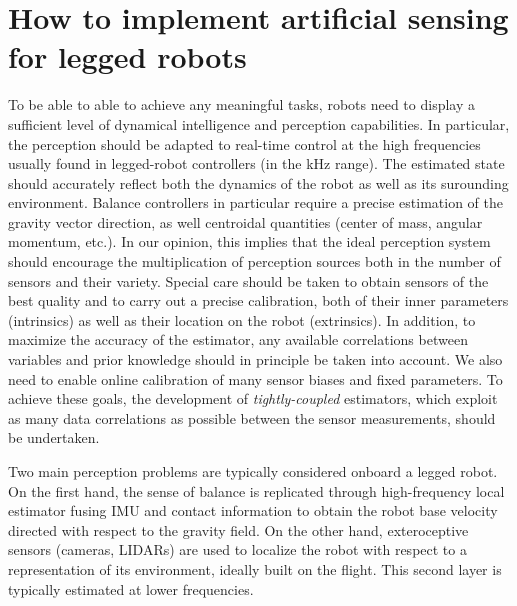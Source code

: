 \section{How to implement artificial sensing for legged robots}
To be able to able to achieve any meaningful tasks, robots need to display a sufficient level of dynamical intelligence and perception capabilities. 
In particular, the perception should be adapted to real-time control at the high frequencies usually found in legged-robot controllers (in the kHz range).
The estimated state should accurately reflect both the dynamics of the robot as well as its surounding environment. Balance controllers in particular require a precise 
estimation of the gravity vector direction, as well centroidal quantities (center of mass, angular momentum, etc.).
In our opinion, this implies that the ideal perception system should encourage the multiplication of perception sources both in the number of sensors and their variety.
Special care should be taken to obtain sensors of the best quality and to carry out a precise calibration, both of their inner parameters (intrinsics) as well as their
location on the robot (extrinsics). 
In addition, to maximize the accuracy of the estimator, any available correlations between variables and prior knowledge should in principle be taken into account. 
We also need to enable online calibration of many sensor biases and fixed parameters. To achieve these goals, the development of \textit{tightly-coupled} estimators, 
which exploit as many data correlations as possible between the sensor measurements, should be undertaken. 

Two main perception problems are typically considered onboard a legged robot. On the first hand, the sense of balance is replicated through high-frequency
local estimator fusing IMU and contact information to obtain the robot base velocity directed with respect to the gravity field. On the other hand,
exteroceptive sensors (cameras, LIDARs) are used to localize the robot with respect to a representation of its environment, ideally built on the flight.
This second layer is typically estimated at lower frequencies.

